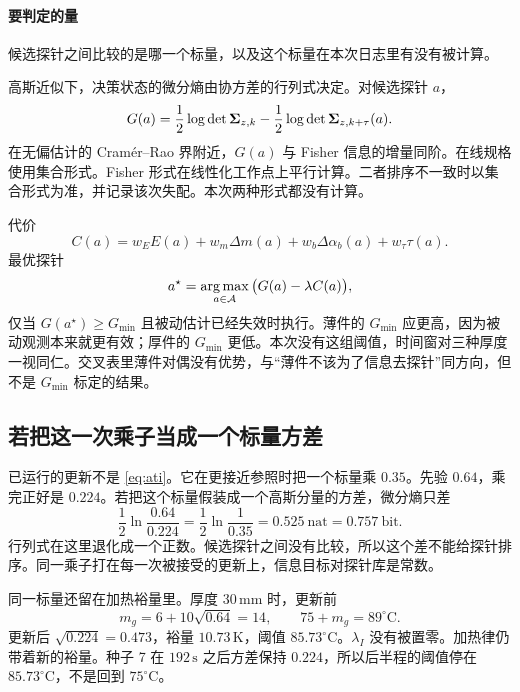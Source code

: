 \paragraph{要判定的量}
候选探针之间比较的是哪一个标量，以及这个标量在本次日志里有没有被计算。

高斯近似下，决策状态的微分熵由协方差的行列式决定。对候选探针 \(a\)，
\begin{equation}
\label{eq:ati}
G(a)=\frac12\log\det\bm{\Sigma}_{z,k}
-\frac12\log\det\bm{\Sigma}_{z,k+\tau}(a).
\end{equation}
在无偏估计的 Cramér–Rao 界附近，\(G(a)\) 与 Fisher 信息的增量同阶。在线规格使用集合形式。Fisher 形式在线性化工作点上平行计算。二者排序不一致时以集合形式为准，并记录该次失配。本次两种形式都没有计算。

代价
\begin{equation}
\label{eq:cost}
C(a)=w_E E(a)+w_m\Delta m(a)+w_b\Delta\alpha_b(a)+w_\tau\tau(a).
\end{equation}
最优探针
\begin{equation}
\label{eq:astar}
a^\star=\operatorname*{arg\,max}_{a\in\mathcal{A}}\big(G(a)-\lambda C(a)\big),
\end{equation}
仅当 \(G(a^\star)\ge G_{\min}\) 且被动估计已经失效时执行。薄件的 \(G_{\min}\) 应更高，因为被动观测本来就更有效；厚件的 \(G_{\min}\) 更低。本次没有这组阈值，时间窗对三种厚度一视同仁。交叉表里薄件对偶没有优势，与“薄件不该为了信息去探针”同方向，但不是 \(G_{\min}\) 标定的结果。

\subsection{若把这一次乘子当成一个标量方差}

已运行的更新不是 \eqref{eq:ati}。它在更接近参照时把一个标量乘 \(0.35\)。先验 \(0.64\)，乘完正好是 \(0.224\)。若把这个标量假装成一个高斯分量的方差，微分熵只差
\begin{equation}
\label{eq:nats}
\frac12\ln\frac{0.64}{0.224}
=\frac12\ln\frac{1}{0.35}
=0.525\ \mathrm{nat}
=0.757\ \mathrm{bit}.
\end{equation}
行列式在这里退化成一个正数。候选探针之间没有比较，所以这个差不能给探针排序。同一乘子打在每一次被接受的更新上，信息目标对探针库是常数。

同一标量还留在加热裕量里。厚度 \(30\,\mathrm{mm}\) 时，更新前
\[
m_g=6+10\sqrt{0.64}=14,\qquad 75+m_g=89^\circ\mathrm{C}.
\]
更新后 \(\sqrt{0.224}=0.473\)，裕量 \(10.73\,\mathrm{K}\)，阈值 \(85.73^\circ\mathrm{C}\)。\(\lambda_I\) 没有被置零。加热律仍带着新的裕量。种子 7 在 \(192\,\mathrm{s}\) 之后方差保持 \(0.224\)，所以后半程的阈值停在 \(85.73^\circ\mathrm{C}\)，不是回到 \(75^\circ\mathrm{C}\)。


